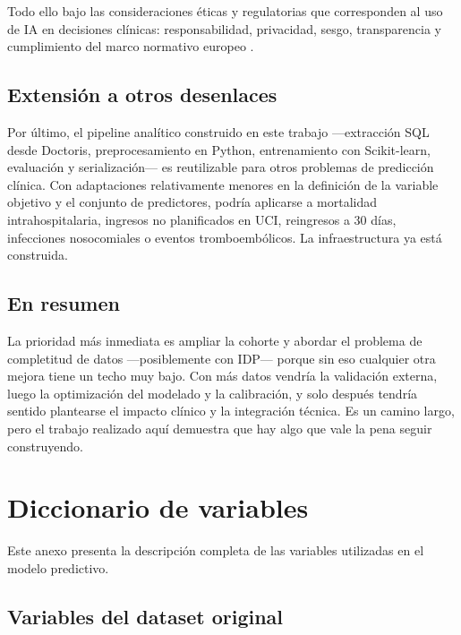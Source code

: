 \documentclass[12pt, a4paper, oneside]{report}
\begin{document}
Todo ello bajo las consideraciones éticas y regulatorias que corresponden al uso de IA en decisiones clínicas: responsabilidad, privacidad, sesgo, transparencia y cumplimiento del marco normativo europeo \parencite{char2018implementing}.

\section{Extensión a otros desenlaces}

Por último, el pipeline analítico construido en este trabajo —extracción SQL desde Doctoris, preprocesamiento en Python, entrenamiento con Scikit-learn, evaluación y serialización— es reutilizable para otros problemas de predicción clínica. Con adaptaciones relativamente menores en la definición de la variable objetivo y el conjunto de predictores, podría aplicarse a mortalidad intrahospitalaria, ingresos no planificados en UCI, reingresos a 30 días, infecciones nosocomiales o eventos tromboembólicos. La infraestructura ya está construida.

\section{En resumen}

La prioridad más inmediata es ampliar la cohorte y abordar el problema de completitud de datos —posiblemente con IDP— porque sin eso cualquier otra mejora tiene un techo muy bajo. Con más datos vendría la validación externa, luego la optimización del modelado y la calibración, y solo después tendría sentido plantearse el impacto clínico y la integración técnica. Es un camino largo, pero el trabajo realizado aquí demuestra que hay algo que vale la pena seguir construyendo.                                                                                                                                                
\newpage
\printbibliography[heading=bibintoc, title={Referencias Bibliográficas}]

\appendix
\chapter{Diccionario de variables}
\label{anexo:diccionario}

Este anexo presenta la descripción completa de las variables utilizadas en el modelo predictivo.

\section{Variables del dataset original}
\end{document}
